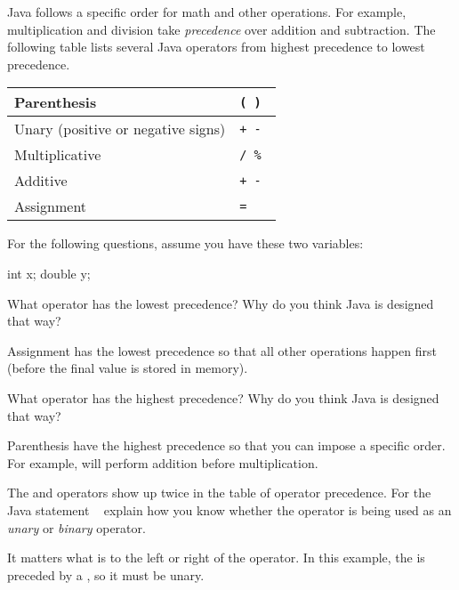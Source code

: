 
Java follows a specific order for math and other operations. For example, multiplication and division take \emph{precedence} over addition and subtraction.
The following table lists several Java operators from highest precedence to lowest precedence.

\begin{center}
\begin{tabular}{|L{3in}|L{1in}|}
\hline
Parenthesis
& \tt ( ) \\
\hline
Unary (positive or negative signs)
& \tt + - \\
\hline
Multiplicative
& \tt * / \% \\
\hline
Additive
& \tt + - \\
\hline
Assignment
& \tt = \\
\hline
\end{tabular}
\end{center}

For the following questions, assume you have these two variables:

\begin{javalst}
    int x;
    double y;
\end{javalst}




\Q What operator has the lowest precedence?
Why do you think Java is designed that way?

\begin{answer}
Assignment has the lowest precedence so that all other operations happen first (before the final value is stored in memory).
\end{answer}


\Q What operator has the highest precedence?
Why do you think Java is designed that way?

\begin{answer}
Parenthesis have the highest precedence so that you can impose a specific order.
For example,  will perform addition before multiplication.
\end{answer}


\Q The \java{+} and \java{-} operators show up twice in the table of operator precedence.
For the Java statement ~ explain how you know whether the \java{-} operator is being used as an \emph{unary} or \emph{binary} operator.

\begin{answer}
It matters what is to the left or right of the operator.
In this example, the \java{-} is preceded by a \java{*}, so it must be unary.
\end{answer}


